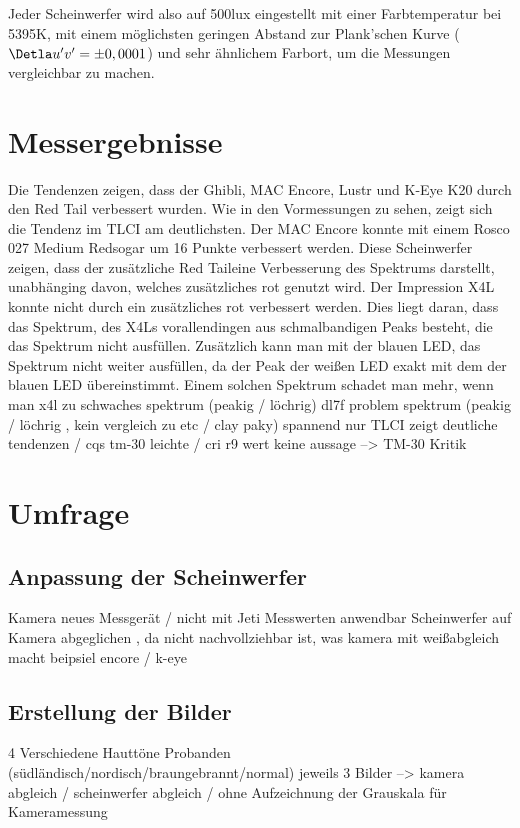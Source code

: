 Jeder Scheinwerfer wird also auf 500lux eingestellt mit einer Farbtemperatur bei 5395K, mit einem möglichsten geringen Abstand zur Plank'schen Kurve ($\Detla u'v'=\pm0,0001$) und sehr ähnlichem Farbort, um die Messungen vergleichbar zu machen.


\chapter{Messergebnisse}

Die Tendenzen zeigen, dass der Ghibli, MAC Encore, Lustr und K-Eye K20 durch den Red Tail verbessert wurden. Wie in den Vormessungen zu sehen, zeigt sich die Tendenz im TLCI am deutlichsten. Der MAC Encore konnte mit einem Rosco 027 \glqq Medium Red\grqq sogar um 16 Punkte verbessert werden. Diese Scheinwerfer zeigen, dass der zusätzliche \glqq Red Tail\grqq eine Verbesserung des Spektrums darstellt, unabhänging davon, welches zusätzliches rot genutzt wird. 
Der Impression X4L konnte nicht durch ein zusätzliches rot verbessert werden. Dies liegt daran, dass das Spektrum, des X4Ls vorallendingen aus schmalbandigen Peaks besteht, die das Spektrum nicht ausfüllen. Zusätzlich kann man mit der blauen LED, das Spektrum nicht weiter ausfüllen, da der Peak der weißen LED exakt mit dem der blauen LED übereinstimmt. Einem solchen Spektrum schadet man mehr, wenn man 
x4l zu schwaches spektrum (peakig / löchrig)
dl7f problem spektrum (peakig / löchrig , kein vergleich zu etc / clay paky)
spannend nur TLCI zeigt deutliche tendenzen / cqs tm-30 leichte / cri r9 wert keine aussage
--> TM-30 Kritik


\chapter{Umfrage}

\section{Anpassung der Scheinwerfer}

Kamera neues Messgerät / nicht mit Jeti Messwerten anwendbar
Scheinwerfer auf Kamera abgeglichen , da nicht nachvollziehbar ist, was kamera mit weißabgleich macht
beipsiel encore / k-eye

\section{Erstellung der Bilder}
4 Verschiedene Hauttöne Probanden (südländisch/nordisch/braungebrannt/normal)
jeweils 3 Bilder --> kamera abgleich / scheinwerfer abgleich / ohne
Aufzeichnung der Grauskala für Kameramessung

